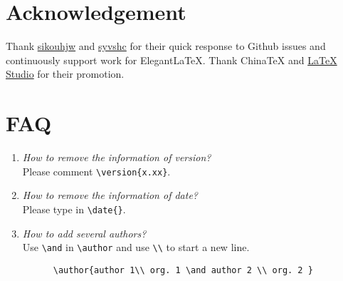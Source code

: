 \documentclass[en,hazy,blue,screen,14pt]{elegantnote}
\begin{document}
\section{Acknowledgement}

Thank \href{https://github.com/sikouhjw}{sikouhjw} and \href{https://github.com/syvshc}{syvshc} for their quick response to Github issues and continuously support work for Elegant\LaTeX{}. Thank China\TeX{} and \href{http://www.latexstudio.net/}{LaTeX Studio} for their promotion. 


\section{FAQ}

\begin{enumerate}[label=\arabic*).]
	\item \textit{How to remove the information of version?}\\
    Please comment \lstinline|\version{x.xx}|.
	\item \textit{How to remove the information of date?}\\
	  Please type in \lstinline|\date{}|.
	\item \textit{How to add several authors?}\\
	  Use \lstinline{\and} in \lstinline{\author} and use \lstinline{\\} to start a new line.
    \begin{lstlisting}
      \author{author 1\\ org. 1 \and author 2 \\ org. 2 }
    \end{lstlisting}
\end{enumerate}
\fi

\end{document}
